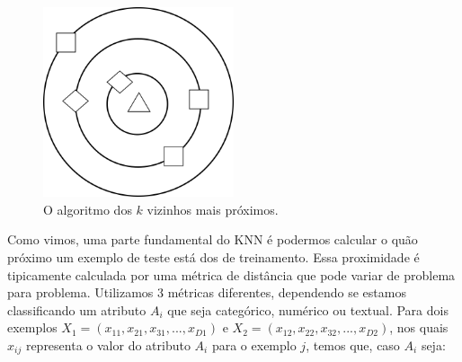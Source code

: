 \begin{figure}[ht!]
\centering
\includegraphics[width=0.5\textwidth]{figures/knn.png}
\caption{O algoritmo dos $k$ vizinhos mais próximos.}
\label{fig::knn}
\end{figure}

Como vimos, uma parte fundamental do \textsc{KNN} é podermos calcular o quão próximo um exemplo de teste está dos de treinamento.
Essa proximidade é tipicamente calculada por uma métrica de distância que pode variar de problema para problema. Utilizamos 3 métricas diferentes, dependendo se estamos classificando um atributo $A_i$ que seja categórico, numérico ou textual. Para dois exemplos $X_1 =  (x_{11}, x_{21}, x_{31}, ..., x_{D1})$ e $X_2 = (x_{12}, x_{22}, x_{32}, ..., x_{D2})$, nos quais $x_{ij}$ representa o valor do atributo $A_i$ para o exemplo $j$, temos que, caso $A_i$ seja:

